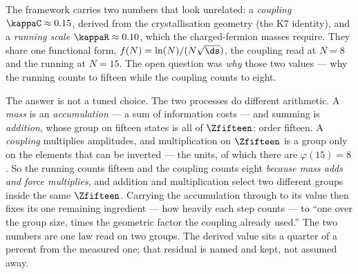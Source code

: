 \documentclass[12pt, a4paper]{article}
\begin{document}
\bigskip

\begin{center}
\end{center}

\bigskip

\begin{keybox}[title={If you are just arriving --- ZC101 in plain language}]
The framework carries two numbers that look unrelated: a \emph{coupling}
$\kappaC\approx0.15$, derived from the crystallisation geometry (the K7
identity), and a \emph{running scale} $\kappaR\approx0.10$, which the
charged-fermion masses require. They share one functional form,
$f(N)=\ln(N)/(N\sqrt{\ds})$, the coupling read at $N=8$ and the running at
$N=15$. The open question was \emph{why} those two values --- why the running
counts to fifteen while the coupling counts to eight.

The answer is not a tuned choice. The two processes do different arithmetic. A
\emph{mass} is an \emph{accumulation} --- a sum of information costs --- and
summing is \emph{addition}, whose group on fifteen states is all of
$\Zfifteen$: order fifteen. A \emph{coupling} multiplies amplitudes, and
multiplication on $\Zfifteen$ is a group only on the elements that can be
inverted --- the units, of which there are $\varphi(15)=8$. So the running counts
fifteen and the coupling counts eight \emph{because mass adds and force
multiplies}, and addition and multiplication select two different groups inside
the same $\Zfifteen$. Carrying the accumulation through to its value then fixes
its one remaining ingredient --- how heavily each step counts --- to ``one over
the group size, times the geometric factor the coupling already used.'' The two
numbers are one law read on two groups. The derived value sits a quarter of a
percent from the measured one; that residual is named and kept, not assumed
away.
\end{keybox}
\end{document}
